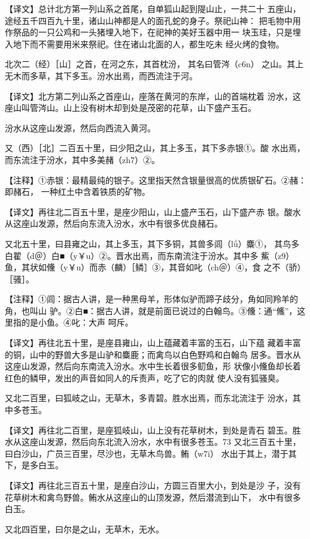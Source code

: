 \documentclass[a4paper,12pt,UTF8,twoside]{ctexbook}
\begin{document}
【译文】总计北方第一列山系之首尾，自单狐山起到隄山止，一共二十 五座山，途经五千四百九十里，诸山山神都是人的面孔蛇的身子。祭祀山神： 把毛物中用作祭品的一只公鸡和一头猪埋入地下，在祀神的美好玉器中用一 块玉珪，只是埋入地下而不需要用米来祭祀。住在诸山北面的人，都生吃未 经火烤的食物。

北次二（经）［山］之首，在河之东，其首枕汾， 其名曰管涔（c6n） 之山。其上无木而多草，其下多玉。汾水出焉，而西流注于河。

【译文】北方第二列山系之首座山，座落在黄河的东岸，山的首端枕着 汾水，这座山叫管涔山。山上没有树木却到处是茂密的花草，山下盛产玉石。

汾水从这座山发源，然后向西流入黄河。

又（西）［北］二百五十里，曰少阳之山，其上多玉，其下多赤银①。酸 水出焉，而东流注于汾水，其中多美赭（zh7）②。

【注释】①赤银：最精最纯的银子。这里指天然含银量很高的优质银矿石。②赭：即赭石， 一种红土中含着铁质的矿物。

【译文】再往北二百五十里，是座少阳山，山上盛产玉石，山下盛产赤 银。酸水从这座山发源，然后向东流入汾水，水中有很多优良赭石。

又北五十里，曰县雍之山，其上多玉，其下多铜，其兽多闾（lǘ）麋①， 其鸟多白翟（d＠）白■（y￥u）②。晋水出焉，而东南流注于汾水。其中多 鮆（z9）鱼，其状如儵（y￥u）而赤（麟）［鳞］③，其音如叱（ch＠）④，食 之不（骄）［骚］。

【注释】①闾：据古人讲，是一种黑母羊，形体似驴而蹄子歧分，角如同羚羊的角，也叫山 驴。②白■：据古人讲，就是前面已说过的白翰鸟。③儵：通“鯈”，这里指的是小鱼。④叱：大声 呵斥。

【译文】再往北五十里，是座县雍山，山上蕴藏着丰富的玉石，山下蕴 藏着丰富的铜，山中的野兽大多是山驴和麋鹿；而禽鸟以白色野鸡和白翰鸟 居多。晋水从这座山发源，然后向东南流入汾水。水中生长着很多鱽鱼，形 状像小儵鱼却长着红色的鳞甲，发出的声音如同人的斥责声，吃了它的肉就 使人没有狐骚臭。

又北二百里，曰狐岐之山，无草木，多青碧。胜水出焉，而东北流注于 汾水，其中多苍玉。

【译文】再往北二百里，是座狐岐山，山上没有花草树木，到处是青石 碧玉。胜水从这座山发源，然后向东北流入汾水，水中有很多苍玉。73 又北三百五十里，曰白沙山，广员三百里，尽沙也，无草木鸟兽。鲔（w7i） 水出于其上，潜于其下，是多白玉。

【译文】再往北三百五十里，是座白沙山，方圆三百里大小，到处是沙 子，没有花草树木和禽鸟野兽。鲔水从这座山的山顶发源，然后潜流到山下， 水中有很多白玉。

又北四百里，曰尔是之山，无草木，无水。
\end{document}
